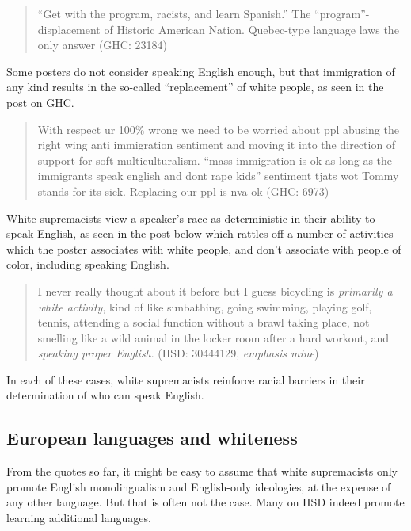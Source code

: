 \documentclass[output=paper,colorlinks,citecolor=brown]{langscibook}
\begin{document}
\begin{quote} 
``Get with the program, racists, and learn Spanish.'' The ``program''\hyp displacement of Historic American Nation. Quebec\hyp type language laws the only answer (GHC: 23184) 
\end{quote}

\noindent Some posters do not consider speaking English enough, but that immigration of any kind results in the so-called ``replacement'' of white people, as seen in the post on GHC.

\begin{quote}
With respect ur 100\% wrong we need to be worried about ppl abusing the right wing anti immigration sentiment and moving it into the direction of support for soft multiculturalism. ``mass immigration is ok as long as the immigrants speak english and dont rape kids'' sentiment tjats wot Tommy stands for its sick. Replacing our ppl is nva ok (GHC: 6973) 
\end{quote}

White supremacists view a speaker's race as deterministic in their ability to speak English, as seen in the post below which rattles off a number of activities which the poster associates with white people, and don't associate with people of color, including speaking English.

\begin{quote}
I never really thought about it before but I guess bicycling is \emph{primarily a white activity}, kind of like sunbathing, going swimming, playing golf, tennis, attending a social function without a brawl taking place, not smelling like a wild animal in the locker room after a hard workout, and \emph{speaking proper English}. (HSD: 30444129, \emph{emphasis mine}) 
\end{quote}

\noindent In each of these cases, white supremacists reinforce racial barriers in their determination of who can speak English.


\subsection{European languages and whiteness}

From the quotes so far, it might be easy to assume that white supremacists only promote English monolingualism and English-only ideologies, at the expense of any other language. But that is often not the case. Many on HSD indeed promote learning additional languages.
\end{document}
